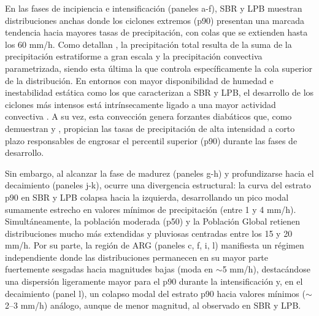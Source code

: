 En las fases de incipiencia e intensificación (paneles a-f), SBR y LPB muestran distribuciones anchas donde los ciclones extremos (p90) presentan una marcada tendencia hacia mayores tasas de precipitación, con colas que se extienden hasta los 60 mm/h. Como detallan \citet{chen2024evaluation}, la precipitación total resulta de la suma de la precipitación estratiforme a gran escala y la precipitación convectiva parametrizada, siendo esta última la que controla específicamente la cola superior de la distribución. En entornos con mayor disponibilidad de humedad e inestabilidad estática como los que caracterizan a SBR y LPB, el desarrollo de los ciclones más intensos está intrínsecamente ligado a una mayor actividad convectiva \citep{sinclair2023relationship}. A su vez, esta convección genera forzantes diabáticos que, como demuestran \citet{oertel2021warm} y \citet{blanchard2021warm}, propician las tasas de precipitación de alta intensidad a corto plazo responsables de engrosar el percentil superior (p90) durante las fases de desarrollo.

Sin embargo, al alcanzar la fase de madurez (paneles g-h) y profundizarse hacia el decaimiento (paneles j-k), ocurre una divergencia estructural: la curva del estrato p90 en SBR y LPB colapsa hacia la izquierda, desarrollando un pico modal sumamente estrecho en valores mínimos de precipitación (entre 1 y 4 mm/h). Simultáneamente, la población moderada (p50) y la Población Global retienen distribuciones mucho más extendidas y pluviosas centradas entre los 15 y 20 mm/h. Por su parte, la región de ARG (paneles c, f, i, l) manifiesta un régimen independiente donde las distribuciones permanecen en su mayor parte fuertemente sesgadas hacia magnitudes bajas (moda en $\sim$5 mm/h), destacándose una dispersión ligeramente mayor para el p90 durante la intensificación y, en el decaimiento (panel l), un colapso modal del estrato p90 hacia valores mínimos ($\sim$2--3 mm/h) análogo, aunque de menor magnitud, al observado en SBR y LPB.

